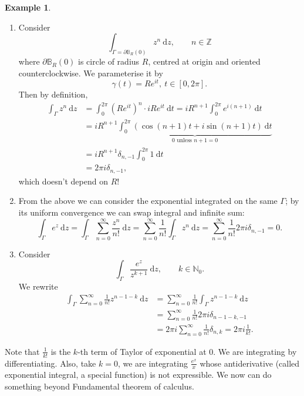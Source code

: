 \documentclass[a4paper]{article}
\theoremstyle{definition}
\newtheorem{example}[defn]{Example}
\begin{document}
\begin{example}
\begin{enumerate}
\item Consider
\[
\int_{\Gamma=\partial \mathbb B_R(0)} z^n \ \mathrm d z,\qquad n\in \mathbb Z
\]
where $\partial \mathbb B_R(0)$ is circle of radius $R$, centred at origin and oriented counterclockwise. We parameterise it by
\[
\gamma (t) = Re^{it},\ t\in [0,2\pi].
\]
Then by definition,
\[
\begin{aligned}
\int_\Gamma z^n \ \mathrm d z &= \int_0^{2\pi} \left(Re^{it}\right)^n \cdot i Re^{it} \ \mathrm d t = i R^{n+1} \int_0^{2\pi} e^{i(n+1)} \ \mathrm d t \\&= i R^{n+1} \underbrace{\int_0^{2\pi} (\cos (n+1) t+ i\sin (n+1) t) \ \mathrm d t}_{0\text{ unless }n+1=0} \\
&= i R^{n+1} \delta_{n,-1} \int_0^{2\pi} 1 \ \mathrm d t \\
&= 2\pi i \delta_{n,-1},
\end{aligned}
\]
which doesn't depend on $R$!
\item From the above we can consider the exponential integrated on the same $\Gamma$; by its uniform convergence we can swap integral and infinite sum:
\[
\int_\Gamma e^z \ \mathrm d z = \int_\Gamma \sum_{n=0}^\infty \frac{z^n}{n!} \ \mathrm d z = \sum_{n=0}^\infty \frac{1}{n!} \int_\Gamma z^n \ \mathrm d z = \sum_{n=0}^\infty \frac{1}{n!} 2\pi i \delta_{n,-1} = 0.
\]
\item Consider
\[
\int_\Gamma \frac{e^z}{z^{k+1}} \ \mathrm d z,\qquad k\in \mathbb N_0.
\]
We rewrite
\[
\begin{aligned}
\int_\Gamma \sum_{n=0}^\infty \frac{1}{n!} z^{n-1-k} \ \mathrm d z &= \sum_{n=0}^\infty \frac{1}{n!} \int_\Gamma z^{n-1-k} \ \mathrm d z \\&= \sum_{n=0}^\infty \frac{1}{n!} 2\pi i \delta_{n-1-k,-1} \\&= 2\pi i \sum_{n=0}^\infty \frac{1}{n!} \delta_{n,k} = 2\pi i \frac{1}{k!} .
\end{aligned}
\]
\end{enumerate}
Note that $\frac{1}{k!}$ is the $k$-th term of Taylor of exponential at 0. We are integrating by differentiating. Also, take $k=0$, we are integrating $\frac{e^x}{x}$ whose antiderivative (called exponential integral, a special function) is not expressible. We now can do something beyond Fundamental theorem of calculus.
\end{example}
\end{document}
